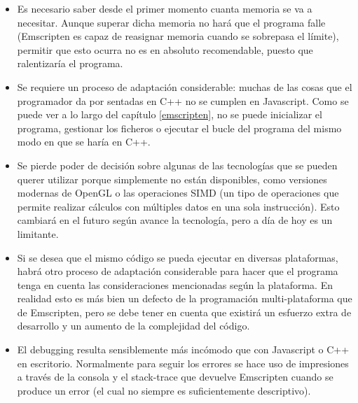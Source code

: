 \begin{itemize}
    \item Es necesario saber desde el primer momento cuanta memoria se va a necesitar. Aunque superar dicha memoria no hará que el programa falle (Emscripten es capaz de reasignar memoria cuando se sobrepasa el límite), permitir que esto ocurra no es en absoluto recomendable, puesto que ralentizaría el programa.
    
    \item Se requiere un proceso de adaptación considerable: muchas de las cosas que el programador da por sentadas en C++ no se cumplen en Javascript. Como se puede ver a lo largo del capítulo \ref{emscripten}, no se puede inicializar el programa, gestionar los ficheros o ejecutar el bucle del programa del mismo modo en que se haría en C++.
    
    \item Se pierde poder de decisión sobre algunas de las tecnologías que se pueden querer utilizar porque simplemente no están disponibles, como versiones modernas de OpenGL o las operaciones SIMD (un tipo de operaciones que permite realizar cálculos con múltiples datos en una sola instrucción). Esto cambiará en el futuro según avance la tecnología, pero a día de hoy es un limitante.
    
    \item Si se desea que el mismo código se pueda ejecutar en diversas plataformas, habrá otro proceso de adaptación considerable para hacer que el programa tenga en cuenta las consideraciones mencionadas según la plataforma. En realidad esto es más bien un defecto de la programación multi-plataforma que de Emscripten, pero se debe tener en cuenta que existirá un esfuerzo extra de desarrollo y un aumento de la complejidad del código.
    
    \item El debugging resulta sensiblemente más incómodo que con Javascript o C++ en escritorio. Normalmente para seguir los errores se hace uso de impresiones a través de la consola y el stack-trace que devuelve Emscripten cuando se produce un error (el cual no siempre es suficientemente descriptivo).
\end{itemize}



